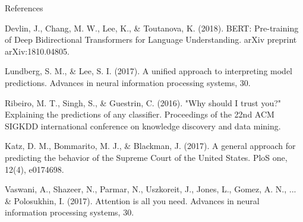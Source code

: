 \begin{frame}{References}
\footnotesize
\begin{thebibliography}{99}
 Devlin, J., Chang, M. W., Lee, K., \& Toutanova, K. (2018). BERT: Pre-training of Deep Bidirectional Transformers for Language Understanding. arXiv preprint arXiv:1810.04805.

 Lundberg, S. M., \& Lee, S. I. (2017). A unified approach to interpreting model predictions. Advances in neural information processing systems, 30.

 Ribeiro, M. T., Singh, S., \& Guestrin, C. (2016). "Why should I trust you?" Explaining the predictions of any classifier. Proceedings of the 22nd ACM SIGKDD international conference on knowledge discovery and data mining.

 Katz, D. M., Bommarito, M. J., \& Blackman, J. (2017). A general approach for predicting the behavior of the Supreme Court of the United States. PloS one, 12(4), e0174698.

 Vaswani, A., Shazeer, N., Parmar, N., Uszkoreit, J., Jones, L., Gomez, A. N., ... \& Polosukhin, I. (2017). Attention is all you need. Advances in neural information processing systems, 30.
\end{thebibliography}
\end{frame}
